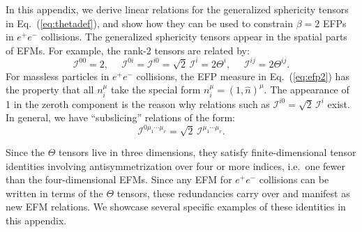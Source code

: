 \documentclass[aps,prd,floatfix,preprintnumbers,twocolumn,groupedaddress,nofootinbib,longbibliography,10pt]{revtex4-1}
\DeclareRobustCommand{\Eq}[1]{Eq.~(\ref{#1})}
\begin{document}
In this appendix, we derive linear relations for the generalized sphericity tensors in \Eq{eq:thetadef}, and show how they can be used to constrain $\beta = 2$ EFPs in $e^+e^-$ collisions.
%
The generalized sphericity tensors appear in the spatial parts of EFMs.
%
For example, the rank-2 tensors are related by:
%
\begin{equation}
\label{eq:rank2efmtheta}
\mathcal I^{00}=2,\quad\,\,\mathcal I^{0i}=\mathcal I^{i0}=\sqrt2\,\mathcal I^i=2\Theta^i,\quad\,\,\mathcal I^{ij}=2\Theta^{ij}.
\end{equation}
%
For massless particles in $e^+e^-$ collisions, the EFP measure in \Eq{eq:efp2} has the property that all $ n_i^\mu$ take the special form $ n_i^\mu=(1, \hat n)^\mu$.
%
The appearance of 1 in the zeroth component is the reason why relations such as $\mathcal I^{i0}=\sqrt2\,\mathcal I^i$ exist.
%
In general, we have ``subslicing'' relations of the form:
\begin{equation}
\mathcal I^{0\mu_1\cdots\mu_v}=\sqrt2\,\mathcal I^{\mu_1\cdots\mu_v}.
\end{equation}


Since the $\Theta$ tensors live in three dimensions, they satisfy finite-dimensional tensor identities involving antisymmetrization over four or more indices, i.e.\ one fewer than the four-dimensional EFMs.
%
Since any EFM for $e^+e^-$ collisions can be written in terms of the $\Theta$ tensors, these redundancies carry over and manifest as new EFM relations.
%
We showcase several specific examples of these identities in this appendix.
\end{document}
